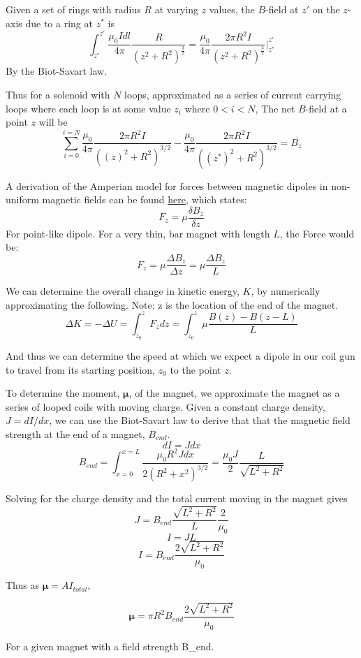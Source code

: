 \documentclass{article}
\begin{document}
	
	Given a set of rings with radius $R$ at varying $z$ values, the $B$-field at $z'$ on the $z$-axis due to a ring at $z^*$ is
	\[
		\int_{z^*}^{z'} \frac{\mu_0 Idl}{4\pi} \frac{R}{(z^2 + R^2)^\frac{3}{2}} = 
		\frac{\mu_0}{4\pi} \frac{2 \pi R^2 I}{(z^2 + R^2)^\frac{3}{2}}\Biggr|_{z^*}^{z'}
	\] 
	By the Biot-Savart law.
	
	Thus for a solenoid with $N$ loops, approximated as a series of current carrying loops where each loop is at some value $z_i$ where $0 < i < N$, The net $B$-field at a point $z$ will be
	\[
		\sum_{i=0}^{i=N} 
		\frac{\mu_0}{4\pi} \frac{2 \pi R^2 I}{((z)^2 + R^2)^{3/2}} -
		\frac{\mu_0}{4\pi} \frac{2 \pi R^2 I}{((z^*)^2 + R^2)^{3/2}}
		= B_z
	\]
	
	A derivation of the Amperian model for forces between magnetic dipoles in non-uniform magnetic fields can be found \href{www.phys.ufl.edu/~acosta/phy2061/lectures/MagneticDipoles.doc}{here}, which states:
	\[F_z = \mu \frac{\delta B_z}{\delta z}\]
	For point-like dipole. For a very thin, bar magnet with length $L$, the Force would be:
	\[F_z = \mu \frac{\Delta B_z}{\Delta z} = \mu \frac{\Delta B_z}{L}\]
	
	We can determine the overall change in kinetic energy, $K$, by numerically approximating the following. Note: z is the location of the end of the magnet.
	\[
		\Delta K = -\Delta U = \int_{z_0}^{z} F_z dz = 
		\int_{z_0}^{z} \mu \frac{B(z) - B(z - L)}{L}
	\]
	
	And thus we can determine the speed at which we expect a dipole in our coil gun to travel from its starting position, $z_0$ to the point $z$.
	
	To determine the moment, $\boldsymbol{\mu}$, of the magnet, we approximate the magnet as a series of looped coils with moving charge. Given a constant charge density, $J = dI/dx$, we can use the Biot-Savart law to derive that that the magnetic field  strength at the end of a magnet, $B_{end}$.    
	$$ dI = Jdx $$
	$$ 
	B_{end} = \int_{x=0}^{x=L} \frac {\mu_0 R^2 Jdx} {2(R^2 + x^2)^{3/2}} =
			  \frac {\mu_0J} {2} \frac {L} {\sqrt{L^2 + R^2}}
	$$
	
	Solving for the charge density and the total current moving in the magnet gives
	$$ J = B_{end} \frac{\sqrt{L^2 + R^2}}{L} \frac{2}{\mu_0} $$
	$$ I = JL $$
	$$ I = B_{end} \frac{2 \sqrt{L^2 + R^2}}{\mu_0} $$
	
	Thus as $\boldsymbol{\mu} = AI_{total}$,
	
	$$ \boldsymbol{\mu} = \pi R^2 B_{end} \frac{2 \sqrt{L^2 + R^2}}{\mu_0} $$
	
	For a given magnet with a field strength B_end.
	
\end{document}
